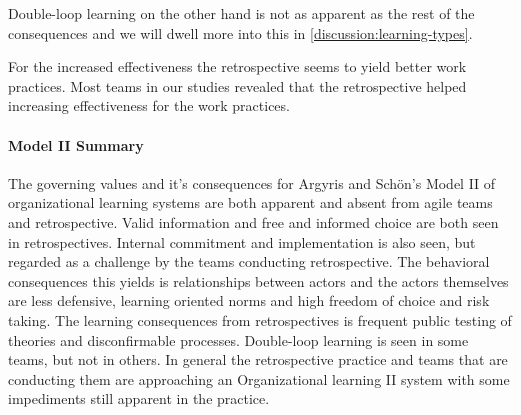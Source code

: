 Double-loop learning on the other hand is not as apparent as the rest of the consequences and we will dwell more into this in \autoref{discussion:learning-types}. 

For the increased effectiveness the retrospective seems to yield better work practices. Most teams in our studies revealed that the retrospective helped increasing effectiveness for the work practices. 

\paragraph{Model II Summary}
The governing values and it's consequences for Argyris and Schön's Model II of organizational learning systems are both apparent and absent from agile teams and retrospective. Valid information and free and informed choice are both seen in retrospectives. Internal commitment and implementation is also seen, but regarded as a challenge by the teams conducting retrospective. The behavioral consequences this yields is relationships between actors and the actors themselves are less defensive, learning oriented norms and high freedom of choice and risk taking. The learning consequences from retrospectives is frequent public testing of theories and disconfirmable processes. Double-loop learning is seen in some teams, but not in others. In general the retrospective practice and teams that are conducting them are approaching an Organizational learning II system with some impediments still apparent in the practice.

